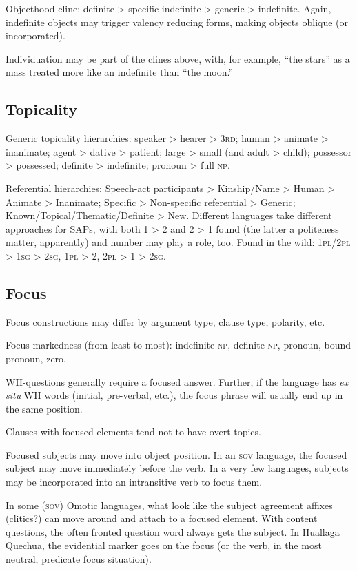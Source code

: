 \documentclass[11pt]{article}
\newcommand{\I}[1]{\textsc{#1}}   %
\begin{document}
{Objecthood cline: definite > specific indefinite > generic >
indefinite.  Again, indefinite objects may trigger valency reducing
forms, making objects oblique (or incorporated).

Individuation may be part of the clines above, with, for example,
``the stars'' as a mass treated more like an indefinite than ``the
moon.'' 


\subsection{Topicality}
Generic topicality hierarchies: speaker > hearer > \I{3rd}; human >
animate > inanimate; agent > dative > patient; large > small (and
adult > child); possessor > possessed; definite > indefinite; pronoun
> full \I{np}.

Referential hierarchies: Speech-act participants > Kinship/Name >
Human > Animate > Inanimate; Specific > Non-specific referential >
Generic; Known/Topical/Thematic/Definite > New.  Different languages
take different approaches for SAPs, with both 1 > 2 and 2 > 1 found
(the latter a politeness matter, apparently) and number may play a
role, too. Found in the wild: \I{1pl/2pl > 1sg > 2sg}, \I{1pl > 2},
\I{2pl > 1 > 2sg}.

\subsection{Focus}
Focus constructions may differ by argument type, clause type,
polarity, etc.

Focus markedness (from least to most): indefinite \I{np}, definite
\I{np}, pronoun, bound pronoun, zero.

WH-questions generally require a focused answer.  Further, if the
language has \textit{ex situ} WH words (initial, pre-verbal, etc.),
the focus phrase will usually end up in the same position.

Clauses with focused elements tend not to have overt topics.

Focused subjects may move into object position. In an \I{sov}
language, the focused subject may move immediately before the verb.
In a very few languages, subjects may be incorporated into an
intransitive verb to focus them.

In some (\I{sov}) Omotic languages, what look like the subject
agreement affixes (clitics?) can move around and attach to a focused
element.  With content questions, the often fronted question word
always gets the subject.  In Huallaga Quechua, the evidential marker
goes on the focus (or the verb, in the most neutral, predicate focus
situation).

}
\end{document}
